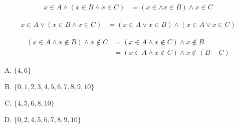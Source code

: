 {{        %
        \begin{practices}
            \begin{align*}
                x \in A \wedge (x \in B \wedge x \in C)
                &= (x \in \wedge x \in B) \wedge x \in C
            \end{align*}
        \end{practices}

        \begin{practices}
            \begin{align*}
                x \in A \vee (x \in B \wedge x \in C)
                &= (x \in A \vee x \in B) \wedge (x \in A \vee x \in C)
            \end{align*}
        \end{practices}

        \begin{practices}
            \begin{align*}
                (x \in A \wedge x \notin B) \wedge x \notin C
                &= (x \in A \wedge x \notin C) \wedge x \notin B \\
                &= (x \in A \wedge x \notin C) \wedge x \notin (B - C)
            \end{align*}
        \end{practices}

        \begin{practices}
            \begin{enumerate}[A.]
                \item $\{4, 6\}$
                \item $\{0, 1, 2, 3, 4, 5, 6, 7, 8, 9, 10\}$
                \item $\{4, 5, 6, 8, 10\}$
                \item $\{0, 2, 4, 5, 6, 7, 8, 9, 10\}$
            \end{enumerate}
        \end{practices}

        \begin{practices}

        \end{practices}

        \begin{practices}

        \end{practices}

        \begin{practices}


\end{practices}}}
